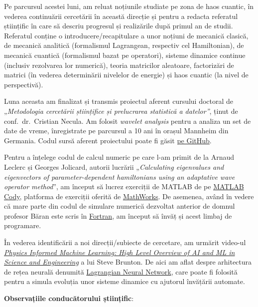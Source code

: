 
\makereportpreamble

Pe parcursul acestei luni, am reluat noțiunile studiate pe zona de haos cuantic, în vederea continuării cercetării în această direcție și pentru a redacta referatul științific în care să descriu progresul și realizările după primul an de studii. Referatul conține o introducere/recapitulare a unor noțiuni de mecanică clasică, de mecanică analitică (formalismul Lagrangean, respectiv cel Hamiltonian), de mecanică cuantică (formalismul bazat pe operatori), sisteme dinamice continue (inclusiv rezolvarea lor numerică), teoria matricilor aleatoare, factorizări de matrici (în vederea determinării nivelelor de energie) și haos cuantic (la nivel de perspectivă).

Luna aceasta am finalizat și transmis proiectul aferent cursului doctoral de „\emph{Metodologia cercetării științifice și prelucrarea statistică a datelor”}, ținut de conf.~dr.~Cristian Necula. Am folosit \emph{wavelet analysis} pentru a analiza un set de date de vreme, înregistrate pe parcursul a 10 ani în orașul Mannheim din Germania. Codul sursă aferent proiectului poate fi găsit \href{https://github.com/GabrielMajeri/wavelet-analysis-project}{pe GitHub}.

Pentru a înțelege codul de calcul numeric pe care l-am primit de la Arnaud Leclerc și Georges Jolicard, autorii lucrării „\emph{Calculating eigenvalues and eigenvectors of parameter-dependent hamiltonians using an adaptative wave operator method}”, am început să lucrez exerciții de MATLAB de pe \href{https://www.mathworks.com/matlabcentral/cody/problems?term=&sort=created+asc}{MATLAB Cody}, platforma de exerciții oferită de \href{https://www.mathworks.com/}{MathWorks}. De asemenea, având în vedere că mare parte din codul de simulare numerică dezvoltat anterior de domnul profesor Băran este scris în \href{https://fortran-lang.org/learn/}{Fortran}, am început să învăț și acest limbaj de programare.

În vederea identificării a noi direcții/subiecte de cercetare, am urmărit video-ul \href{https://www.youtube.com/watch?v=JoFW2uSd3Uo}{\emph{Physics Informed Machine Learning: High Level Overview of AI and ML in Science and Engineering}} a lui Steve Brunton. De aici am aflat despre arhitectura de rețea neurală denumită \href{https://arxiv.org/abs/2003.04630}{Lagrangian Neural Network}, care poate fi folosită pentru a simula evoluția unor sisteme dinamice cu ajutorul învățării automate.

\vspace{0.5em}

\textbf{Observațiile conducătorului științific}:

\vspace{3em}


